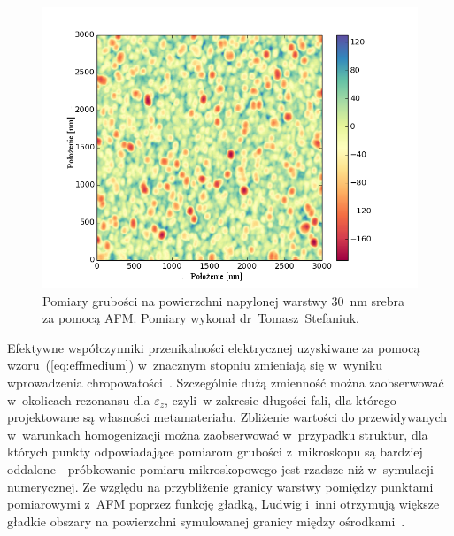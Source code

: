 \begin{figure}[htb]
		\includegraphics[width=\textwidth]{images/multilayer/ag30nm-afm-measure.png}
		\caption{Pomiary grubości na powierzchni napylonej warstwy $30$~nm srebra za pomocą AFM. Pomiary wykonał dr~Tomasz~Stefaniuk.} 
		\label{fig:ag30nm-afmmeasure}
\end{figure}


Efektywne współczynniki przenikalności elektrycznej uzyskiwane za pomocą wzoru~(\ref{eq:effmedium}) w~znacznym stopniu zmieniają się w~wyniku wprowadzenia chropowatości~\cite{ludwig2012impact}. Szczególnie dużą zmienność można zaobserwować w~okolicach rezonansu dla $\varepsilon_{z}$, czyli~w zakresie długości fali, dla którego projektowane są własności metamateriału. Zbliżenie wartości do przewidywanych w~warunkach homogenizacji można zaobserwować w~przypadku struktur, dla których punkty odpowiadające pomiarom grubości z~mikroskopu są bardziej oddalone - próbkowanie pomiaru mikroskopowego jest rzadsze niż w~symulacji numerycznej. Ze względu na przybliżenie granicy warstwy pomiędzy punktami pomiarowymi z~AFM poprzez funkcję gładką, Ludwig i~inni otrzymują większe gładkie obszary na powierzchni symulowanej granicy między ośrodkami~\cite{ludwig2012impact}. 

